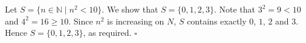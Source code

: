 Let $S = \{n \in \mathbb{N} \mid n^{2} < 10\}$.
We show that $S = \{0, 1, 2, 3\}$.
Note that $3^{2} = 9 < 10$ and $4^{2} = 16 \geq 10$.
Since $n^{2}$ is increasing on $N$, $S$ contains exactly $0$, $1$, $2$ and $3$.
Hence $S = \{0, 1, 2, 3\}$, as required. \hfill$\square$